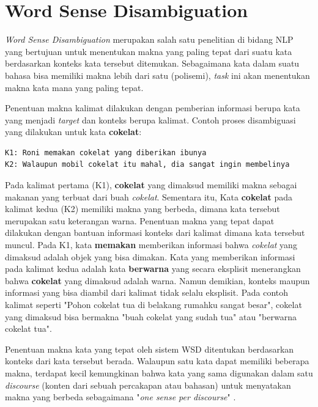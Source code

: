 \section{Word Sense Disambiguation}
\textit{Word Sense Disambiguation} merupakan salah satu penelitian di bidang NLP yang bertujuan untuk menentukan makna yang paling tepat dari suatu kata berdasarkan konteks kata tersebut ditemukan. Sebagaimana kata dalam suatu bahasa bisa memiliki makna lebih dari satu (polisemi), \textit{task} ini akan menentukan makna kata mana yang paling tepat. 

Penentuan makna kalimat dilakukan dengan pemberian informasi berupa kata yang menjadi \textit{target} dan konteks berupa kalimat. Contoh proses disambiguasi yang dilakukan untuk kata \textbf{cokelat}:

\begin{lstlisting}[backgroundcolor = \color{white}]
K1: Roni memakan cokelat yang diberikan ibunya
K2: Walaupun mobil cokelat itu mahal, dia sangat ingin membelinya
\end{lstlisting}


Pada kalimat pertama (K1), \textbf{cokelat} yang dimaksud memiliki makna sebagai makanan yang terbuat dari buah \textit{cokelat}. Sementara itu, Kata \textbf{cokelat} pada kalimat kedua (K2) memiliki makna yang berbeda, dimana kata tersebut merupakan satu keterangan warna. Penentuan makna yang tepat dapat dilakukan dengan bantuan informasi konteks dari kalimat dimana kata tersebut muncul. Pada K1, kata \textbf{memakan} memberikan informasi bahwa \textit{cokelat} yang dimaksud adalah objek yang bisa dimakan. Kata yang memberikan informasi pada kalimat kedua adalah kata \textbf{berwarna} yang secara eksplisit menerangkan bahwa \textbf{cokelat} yang dimaksud adalah warna. Namun demikian, konteks maupun informasi yang bisa diambil dari kalimat tidak selalu eksplisit. Pada contoh kalimat seperti "Pohon cokelat tua di belakang rumahku sangat besar", cokelat yang dimaksud bisa bermakna "buah cokelat yang sudah tua" atau "berwarna cokelat tua".

Penentuan makna kata yang tepat oleh sistem WSD ditentukan berdasarkan konteks dari kata tersebut berada. Walaupun satu kata dapat memiliki beberapa makna, terdapat kecil kemungkinan bahwa kata yang sama digunakan dalam satu \textit{discourse} (konten dari sebuah percakapan atau bahasan) untuk menyatakan makna yang berbeda sebagaimana "\textit{one sense per discourse}" \citep{gale1992one}.

